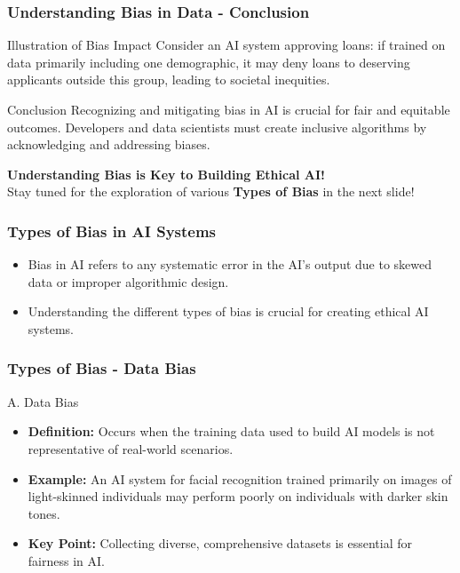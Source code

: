 \documentclass[aspectratio=169]{beamer}
\begin{document}
\begin{frame}[fragile]
    \frametitle{Understanding Bias in Data - Conclusion}
    \begin{block}{Illustration of Bias Impact}
        Consider an AI system approving loans: if trained on data primarily including one demographic, it may deny loans to deserving applicants outside this group, leading to societal inequities.
    \end{block}
    
    \begin{block}{Conclusion}
        Recognizing and mitigating bias in AI is crucial for fair and equitable outcomes. Developers and data scientists must create inclusive algorithms by acknowledging and addressing biases.
    \end{block}
    
    \begin{center}
        \textbf{Understanding Bias is Key to Building Ethical AI!}\\
        Stay tuned for the exploration of various \textbf{Types of Bias} in the next slide!
    \end{center}
\end{frame}

\begin{frame}[fragile]
    \frametitle{Types of Bias in AI Systems}
    
    \begin{itemize}
        \item Bias in AI refers to any systematic error in the AI's output due to skewed data or improper algorithmic design.
        \item Understanding the different types of bias is crucial for creating ethical AI systems.
    \end{itemize}
\end{frame}

\begin{frame}[fragile]
    \frametitle{Types of Bias - Data Bias}
    
    \begin{block}{A. Data Bias}
        \begin{itemize}
            \item \textbf{Definition:} Occurs when the training data used to build AI models is not representative of real-world scenarios.
            \item \textbf{Example:} An AI system for facial recognition trained primarily on images of light-skinned individuals may perform poorly on individuals with darker skin tones.
            \item \textbf{Key Point:} Collecting diverse, comprehensive datasets is essential for fairness in AI.
        \end{itemize}
    \end{block}
\end{frame}
\end{document}
